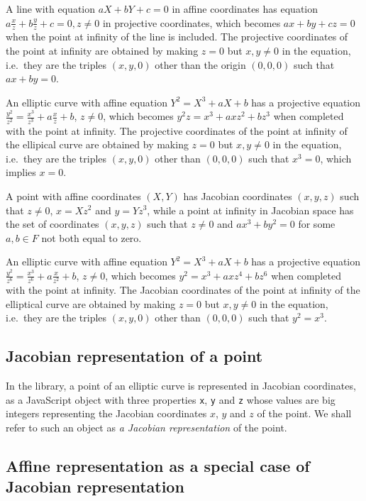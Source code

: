\documentclass[12pt]{article}
\begin{document}
A line with equation $aX+bY+c=0$ in affine coordinates has equation
$a\frac{x}{z}+b\frac{y}{z}+c=0, z\not=0$ in projective coordinates,
which becomes $ax+by+cz=0$ when the point at infinity of the line is
included.  The projective coordinates of the point at infinity are
obtained by making $z=0$ but $x,y\not=0$ in the equation, i.e.\ they
are the triples $(x,y,0)$ other than the origin $(0,0,0)$
such that $ax+by=0$.

An elliptic curve with affine equation $Y^2 = X^3 + aX + b$ has a
projective equation $\frac{y^2}{z^2} = \frac{x^3}{z^3} + a\frac{x}{z}
+ b$, $z\not=0$, which becomes $y^2z = x^3 + axz^2 + bz^3$ when
completed with the point at infinity.  The projective coordinates of
the point at infinity of the ellipical curve are obtained by making
$z=0$ but $x,y\not=0$ in the equation, i.e.\ they are the triples
$(x,y,0)$ other than $(0,0,0)$ such that $x^3=0$, which implies $x=0$.

A point with affine coordinates $(X,Y)$ has Jacobian coordinates
$(x,y,z)$ such that $z\not=0$, $x=Xz^2$ and $y=Yz^3$, while a point at
infinity in Jacobian space has the set of coordinates $(x,y,z)$ such that $z\not=0$ and
$ax^3+by^2=0$ for some $a,b\in F$ not both equal to zero.

An elliptic curve with affine equation $Y^2=X^3+aX+b$ has a
projective equation $\frac{y^2}{z^6} = \frac{x^3}{z^6} +
a\frac{x}{z^2} + b$, $z\not=0$, which becomes $y^2 = x^3 + axz^4 + bz^6$ when
completed with the point at infinity.  The Jacobian coordinates of the
point at infinity of the elliptical curve are obtained by making
$z=0$ but $x,y\not=0$ in the equation, i.e.\ they are the triples
$(x,y,0)$ other than $(0,0,0)$ such that $y^2 = x^3$.

\subsection{Jacobian representation of a point}

In the library, a point of an elliptic curve is represented in
Jacobian coordinates, as a JavaScript object with three properties
{\tt x}, {\tt y} and {\tt z} whose values are big integers
representing the Jacobian coordinates $x$, $y$ and $z$ of the point.
We shall refer to such an object as {\em a Jacobian representation\/}
of the point.  

\subsection{Affine representation as a special case of Jacobian representation}
\label{s:affine}
\end{document}
